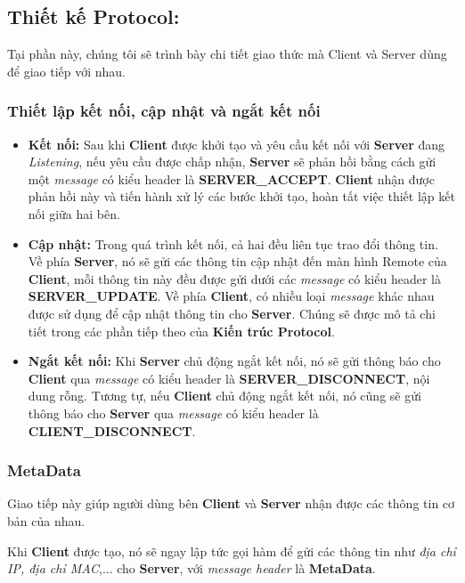 \subsection{Thiết kế Protocol: }

Tại phần này, chúng tôi sẽ trình bày chi tiết giao thức mà Client và Server dùng để giao tiếp với nhau. 

\subsubsection{Thiết lập kết nối, cập nhật và ngắt kết nối}

\begin{itemize}
	\item \textbf{Kết nối: } Sau khi \textbf{Client} được khởi tạo và yêu cầu kết nối với \textbf{Server} đang \textit{Listening}, nếu yêu cầu được chấp nhận, \textbf{Server} sẽ phản hồi bằng cách gửi một \textit{message} có kiểu header là \textbf{SERVER\_ACCEPT}. \textbf{Client} nhận được phản hồi này và tiến hành xử lý các bước khởi tạo, hoàn tất việc thiết lập kết nối giữa hai bên.
	\item \textbf{Cập nhật: } Trong quá trình kết nối, cả hai đều liên tục trao đổi thông tin. Về phía \textbf{Server}, nó sẽ gửi các thông tin cập nhật đến màn hình Remote của \textbf{Client}, mỗi thông tin này đều được gửi dưới các \textit{message} có kiểu header là \textbf{SERVER\_UPDATE}. Về phía \textbf{Client}, có nhiều loại \textit{message} khác nhau được sử dụng để cập nhật thông tin cho \textbf{Server}. Chúng sẽ được mô tả chi tiết trong các phần tiếp theo của \textbf{Kiến trúc Protocol}.
	\item \textbf{Ngắt kết nối: }Khi \textbf{Server} chủ động ngắt kết nối, nó sẽ gửi thông báo cho \textbf{Client} qua \textit{message} có kiểu header là \textbf{SERVER\_DISCONNECT}, nội dung rỗng. Tương tự, nếu \textbf{Client} chủ động ngắt kết nối, nó cũng sẽ gửi thông báo cho \textbf{Server} qua \textit{message} có kiểu header là \textbf{CLIENT\_DISCONNECT}.
\end{itemize}
	
\subsubsection{MetaData}

Giao tiếp này giúp người dùng bên \textbf{Client} và \textbf{Server} nhận được các thông tin cơ bản của nhau.

Khi \textbf{Client} được tạo, nó sẽ ngay lập tức gọi hàm để gửi các thông tin như \textit{địa chỉ IP, địa chỉ MAC},... cho \textbf{Server}, với \textit{message header} là \textbf{MetaData}.

